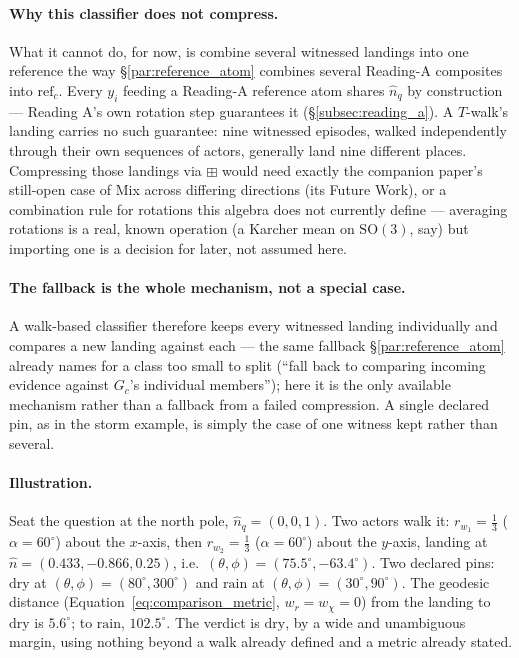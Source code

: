 \documentclass[12pt, a4paper]{article}
\begin{document}
\paragraph{Why this classifier does not compress.}
What it cannot do, for now, is combine several witnessed landings
into one reference the way \S\ref{par:reference_atom} combines
several Reading-A composites into $\mathrm{ref}_c$. Every $y_i$
feeding a Reading-A reference atom shares $\hat n_q$ by construction
--- Reading A's own rotation step guarantees it
(\S\ref{subsec:reading_a}). A $T$-walk's landing carries no such
guarantee: nine witnessed episodes, walked independently through
their own sequences of actors, generally land nine different places.
Compressing those landings via $\boxplus$ would need exactly the
companion paper's still-open case of Mix across differing directions
(its Future Work), or a combination rule for rotations this algebra
does not currently define --- averaging rotations is a real, known
operation (a Karcher mean on $\mathrm{SO}(3)$, say) but importing one
is a decision for later, not assumed here.

\paragraph{The fallback is the whole mechanism, not a special case.}
A walk-based classifier therefore keeps every witnessed landing
individually and compares a new landing against each --- the same
fallback \S\ref{par:reference_atom} already names for a class too
small to split (``fall back to comparing incoming evidence against
$G_c$'s individual members''); here it is the only available
mechanism rather than a fallback from a failed compression. A single
declared pin, as in the storm example, is simply the case of one
witness kept rather than several.

\paragraph{Illustration.} Seat the question at the north pole,
$\hat n_q=(0,0,1)$. Two actors walk it: $r_{w_1}=\tfrac13$
($\alpha=60^\circ$) about the $x$-axis, then $r_{w_2}=\tfrac13$
($\alpha=60^\circ$) about the $y$-axis, landing at
$\hat n=(0.433,-0.866,0.25)$, i.e.\ $(\theta,\phi)=(75.5^\circ,
-63.4^\circ)$. Two declared pins: $\mathrm{dry}$ at
$(\theta,\phi)=(80^\circ,300^\circ)$ and $\mathrm{rain}$ at
$(\theta,\phi)=(30^\circ,90^\circ)$. The geodesic distance
(Equation~\eqref{eq:comparison_metric}, $w_r=w_\chi=0$) from the
landing to $\mathrm{dry}$ is $5.6^\circ$; to $\mathrm{rain}$,
$102.5^\circ$. The verdict is $\mathrm{dry}$, by a wide and
unambiguous margin, using nothing beyond a walk already defined and a
metric already stated.
\end{document}
